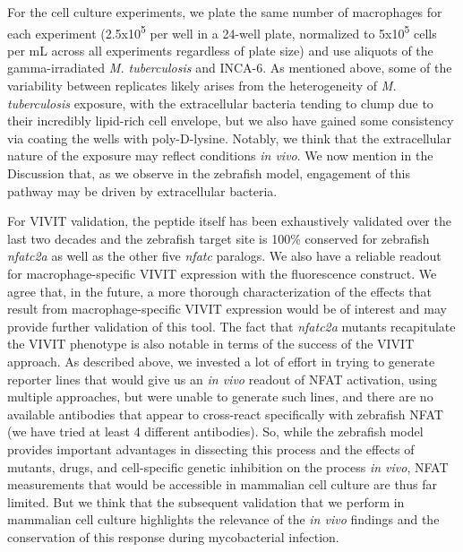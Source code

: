 \begin{description}[style=multiline, labelwidth=\widthof{Reviewer \#2:   }, font=\normalfont, leftmargin=\labelwidth, align=right]
\item[Response: ] \quad For the cell culture experiments, we plate the same number of macrophages for each experiment (2.5x10\textsuperscript{5} per well in a 24\hyp{}well plate, normalized to 5x10\textsuperscript{5} cells per mL across all experiments regardless of plate size) and use aliquots of the gamma\hyp{}irradiated \textit{M. tuberculosis} and INCA\hyp{}6. As mentioned above, some of the variability between replicates likely arises from the heterogeneity of \textit{M. tuberculosis} exposure, with the extracellular bacteria tending to clump due to their incredibly lipid\hyp{}rich cell envelope, but we also have gained some consistency via coating the wells with poly\hyp{}D\hyp{}lysine. Notably, we think that the extracellular nature of the exposure may reflect conditions \textit{in vivo}. We now mention in the Discussion that, as we observe in the zebrafish model, engagement of this pathway may be driven by extracellular bacteria.

\item \quad For VIVIT validation, the peptide itself has been exhaustively validated over the last two decades and the zebrafish target site is 100\% conserved for zebrafish \textit{nfatc2a} as well as the other five \textit{nfatc} paralogs. We also have a reliable readout for macrophage\hyp{}specific VIVIT expression with the fluorescence construct. We agree that, in the future, a more thorough characterization of the effects that result from macrophage\hyp{}specific VIVIT expression would be of interest and may provide further validation of this tool. The fact that \textit{nfatc2a} mutants recapitulate the VIVIT phenotype is also notable in terms of the success of the VIVIT approach. As described above, we invested a lot of effort in trying to generate reporter lines that would give us an \textit{in vivo} readout of NFAT activation, using multiple approaches, but were unable to generate such lines, and there are no available antibodies that appear to cross\hyp{}react specifically with zebrafish NFAT (we have tried at least 4 different antibodies). So, while the zebrafish model provides important advantages in dissecting this process and the effects of mutants, drugs, and cell\hyp{}specific genetic inhibition on the process \textit{in vivo}, NFAT measurements that would be accessible in mammalian cell culture are thus far limited. But we think that the subsequent validation that we perform in mammalian cell culture highlights the relevance of the \textit{in vivo} findings and the conservation of this response during mycobacterial infection. 


\end{description}
